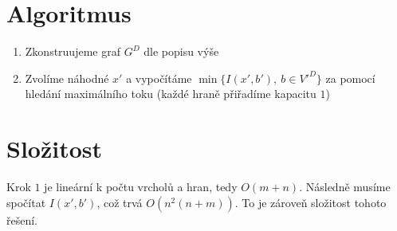 \documentclass[a4paper]{article}
\begin{document}
\section*{Algoritmus}
\begin{enumerate}
\item Zkonstruujeme graf $G^D$ dle popisu výše
\item Zvolíme náhodné $x'$ a vypočítáme $\min \{ I(x',b'),\ b \in V'^D \}$ za pomocí hledání maximálního toku (každé hraně přiřadíme kapacitu $1$)
\end{enumerate}

\section*{Složitost}
Krok $1$ je lineární k počtu vrcholů a hran, tedy $O(m+n)$. Následně musíme spočítat $I(x', b')$, což trvá $O(n^2 (n+m))$. To je zároveň složitost tohoto řešení.
\end{document}
